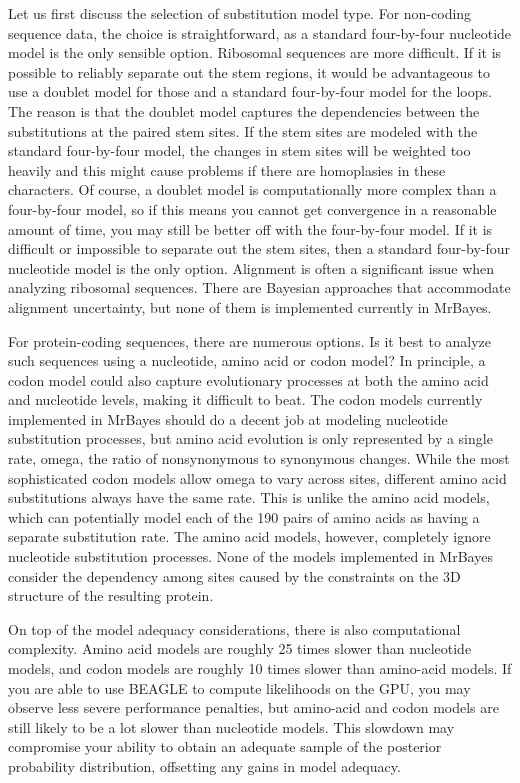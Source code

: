 \documentclass[12pt]{book}
\begin{document}
Let us first discuss the selection of substitution model type. For non-coding sequence data, the
choice is straightforward, as a standard four-by-four nucleotide model is the only sensible option.
Ribosomal sequences are more difficult. If it is possible to reliably separate out the stem
regions, it would be advantageous to use a doublet model for those and a standard four-by-four
model for the loops. The reason is that the doublet model captures the dependencies between the
substitutions at the paired stem sites. If the stem sites are modeled with the standard
four-by-four model, the changes in stem sites will be weighted too heavily and this might cause
problems if there are homoplasies in these characters. Of course, a doublet model is
computationally more complex than a four-by-four model, so if this means you cannot get convergence
in a reasonable amount of time, you may still be better off with the four-by-four model. If it is
difficult or impossible to separate out the stem sites, then a standard four-by-four nucleotide
model is the only option. Alignment is often a significant issue when analyzing ribosomal
sequences. There are Bayesian approaches that accommodate alignment uncertainty, but none of them
is implemented currently in MrBayes.

For protein-coding sequences, there are numerous options. Is it best to analyze such sequences
using a nucleotide, amino acid or codon model? In principle, a codon model could also capture
evolutionary processes at both the amino acid and nucleotide levels, making it difficult to beat.
The codon models currently implemented in MrBayes should do a decent job at modeling nucleotide
substitution processes, but amino acid evolution is only represented by a single rate, omega, the
ratio of nonsynonymous to synonymous changes. While the most sophisticated codon models allow omega
to vary across sites, different amino acid substitutions always have the same rate. This is unlike
the amino acid models, which can potentially model each of the 190 pairs of amino acids as having a
separate substitution rate. The amino acid models, however, completely ignore nucleotide
substitution processes. None of the models implemented in MrBayes consider the dependency among
sites caused by the constraints on the 3D structure of the resulting protein.

On top of the model adequacy considerations, there is also computational complexity. Amino acid
models are roughly 25 times slower than nucleotide models, and codon models are roughly 10 times
slower than amino-acid models. If you are able to use BEAGLE to compute likelihoods on the GPU, you
may observe less severe performance penalties, but amino-acid and codon models are still likely to
be a lot slower than nucleotide models. This slowdown may compromise your ability to obtain an
adequate sample of the posterior probability distribution, offsetting any gains in model adequacy.
\end{document}

